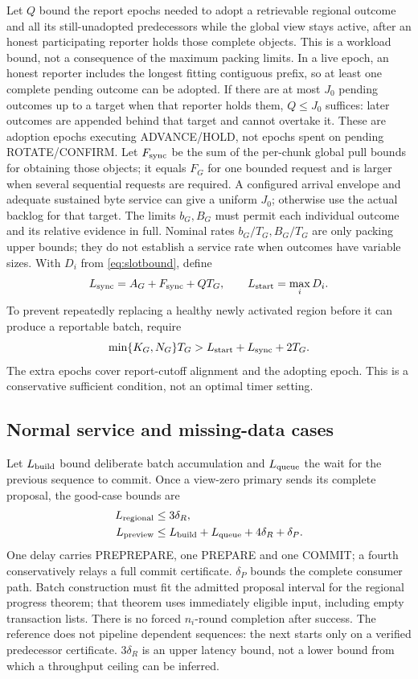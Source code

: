 \documentclass[11pt,a4paper,onecolumn]{article}
\theoremstyle{remark}\newtheorem{example}[definition]{Example}
\begin{document}
Let $Q$ bound the report epochs needed to adopt a retrievable regional outcome
and all its still-unadopted predecessors while the global view stays active,
after an honest participating reporter holds those complete objects.
This is a workload bound, not a consequence of the maximum packing limits.
In a live epoch, an honest reporter includes the longest fitting contiguous
prefix, so at least one complete pending outcome can be adopted. If there are
at most $J_0$ pending outcomes up to a target when that reporter holds them,
$Q\leq J_0$ suffices: later outcomes are appended behind that target and cannot
overtake it. These are adoption epochs executing ADVANCE/HOLD, not epochs
spent on pending ROTATE/CONFIRM. Let $F_{\rm sync}$ be the sum of the per-chunk
global pull bounds for obtaining those objects; it equals $F_G$ for one bounded
request and is larger when several sequential requests are required.
A configured arrival envelope and adequate sustained byte service
can give a uniform $J_0$; otherwise use the actual backlog for that target.
The limits $b_G,B_G$ must permit each individual outcome and its relative
evidence in full. Nominal rates $b_G/T_G,B_G/T_G$ are only packing upper bounds;
they do not establish a service rate when outcomes have variable sizes.
With $D_i$ from \eqref{eq:slotbound}, define
\[
 L_{\rm sync}=A_G+F_{\rm sync}+QT_G,\qquad
 L_{\rm start}=\max_i D_i.
\]
To prevent repeatedly replacing a healthy newly activated region before it can
produce a reportable batch, require
\begin{equation}\label{eq:tenure}
 \min\{K_G,N_G\}T_G>L_{\rm start}+L_{\rm sync}+2T_G.
\end{equation}
The extra epochs cover report-cutoff alignment and the adopting epoch. This is
a conservative sufficient condition, not an optimal timer setting.

\subsection{Normal service and missing-data cases}

Let $L_{\rm build}$ bound deliberate batch accumulation and $L_{\rm queue}$
the wait for the previous sequence to commit. Once a view-zero primary sends
its complete proposal, the good-case bounds are
\begin{align}
 L_{\rm regional}&\leq3\delta_R,\label{eq:fast}\\
 L_{\rm preview}&\leq L_{\rm build}+L_{\rm queue}+4\delta_R+\delta_P.
 \label{eq:preview}
\end{align}
One delay carries PREPREPARE, one PREPARE and one COMMIT; a fourth conservatively
relays a full commit certificate. $\delta_P$ bounds the complete consumer path.
Batch construction must fit the admitted proposal interval for the regional
progress theorem; that theorem uses immediately eligible input, including empty
transaction lists. There is no forced $n_i$-round completion after success.
The reference does not pipeline dependent sequences: the next starts only on
a verified predecessor certificate. $3\delta_R$ is an upper latency bound, not
a lower bound from which a throughput ceiling can be inferred.
\end{document}
